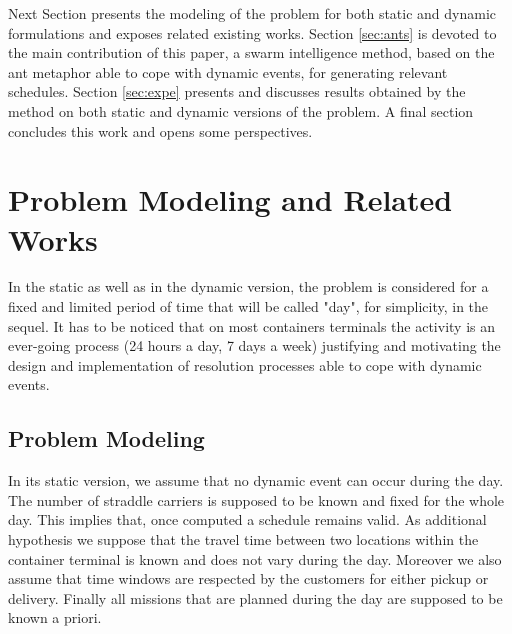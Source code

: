 \documentclass[a4paper,12pt]{article}
\begin{document}
Next Section presents the modeling of the problem for both static and dynamic formulations and exposes related existing works. Section \ref{sec:ants} is devoted to the main contribution of this paper, a swarm intelligence method, based on the ant metaphor able to cope with dynamic events, for generating relevant schedules. Section \ref{sec:expe} presents and discusses results obtained by the method on both static and dynamic versions of the problem. A final section concludes this work and opens some perspectives.


\section{Problem Modeling and Related Works}


In the static as well as in the dynamic version, the problem is considered for a fixed and limited period of time that will be called "day", for simplicity, in the sequel. It has to be noticed that on most containers terminals the activity is an ever-going process (24 hours a day, 7 days a week) justifying and motivating the design and implementation of resolution processes able to cope with dynamic events. 

\subsection{Problem Modeling}

In its static version, we assume that no dynamic event can occur during the day. The number of straddle carriers is supposed to be known and fixed for the whole day. This implies that, once computed a schedule remains valid. As additional hypothesis we suppose that the travel time between two locations within the container terminal is known and does not vary during the day. Moreover we also assume that time windows are respected by the customers for either pickup or delivery. Finally all missions that are planned during the day are supposed to be known a priori. \\
\end{document}
